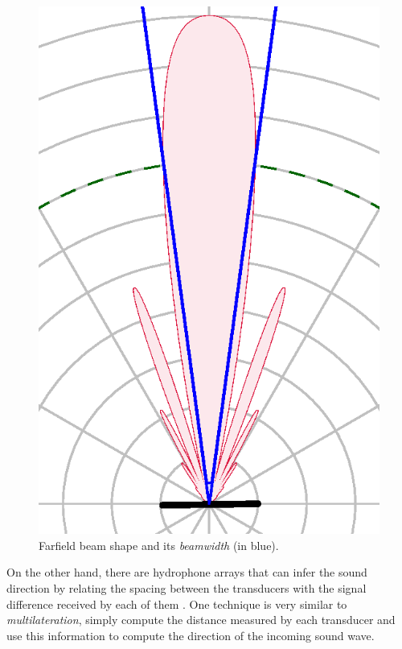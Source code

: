 \begin{figure}[h]
	\centering
	\includegraphics[scale=0.6,trim={0.46 0.072 0.46
	1.03},clip]{Chap2/fig/directivity.eps}
	\caption{Farfield beam shape and its \textit{beamwidth} (in blue).}
	\label{fig:beamwidth}
\end{figure}

On the other hand, there are hydrophone arrays that can infer the sound
direction by relating the spacing between the transducers with the signal
difference received by each of them \cite{bearing,beamforming}. One technique is
very similar to \textit{multilateration}, simply compute the distance measured
by each transducer and use this information to compute the direction of the
incoming sound wave.

